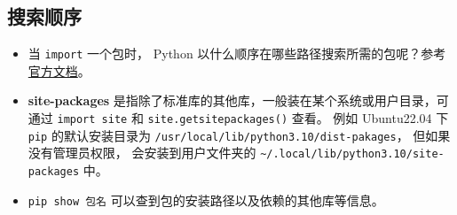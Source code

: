 \subsection{搜索顺序}
\begin{itemize}
\item 当 \verb`import` 一个包时， Python 以什么顺序在哪些路径搜索所需的包呢？参考\href{https://docs.python.org/3/tutorial/modules.html#the-module-search-path}{官方文档}。
\item \textbf{site-packages} 是指除了标准库的其他库，一般装在某个系统或用户目录，可通过 \verb`import site` 和 \verb`site.getsitepackages()` 查看。  例如 Ubuntu22.04 下 \verb`pip` 的默认安装目录为 \verb`/usr/local/lib/python3.10/dist-pakages`， 但如果没有管理员权限， 会安装到用户文件夹的 \verb`~/.local/lib/python3.10/site-packages` 中。
\item \verb`pip show 包名` 可以查到包的安装路径以及依赖的其他库等信息。
\end{itemize}

